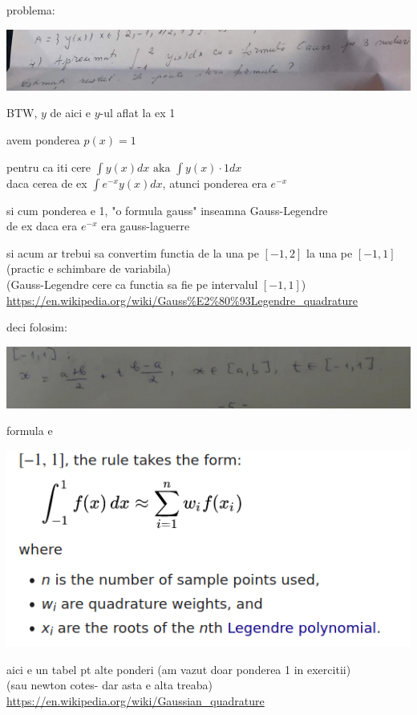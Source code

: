 \documentclass[11pt]{article}
\date{\today}
\title{}
\begin{document}
problema:
\begin{center}
\includegraphics[width=\linewidth]{./problema.png}
\end{center}

BTW, \(y\) de aici e \(y\)-ul aflat la ex 1

avem ponderea \(p(x) = 1\)
\medskip

pentru ca iti cere \(\displaystyle \int y(x) dx \text{ aka } \int y(x) \cdot 1 dx\)\\
daca cerea de ex \(\displaystyle \int e^{-x} y(x) dx\), atunci ponderea era \(e^{-x}\)
\medskip

si cum ponderea e 1, "o formula gauss" inseamna Gauss-Legendre\\
de ex daca era \(e^{-x}\) era gauss-laguerre
\medskip

si acum ar trebui sa convertim functia de la una pe \([-1, 2]\) la una pe \([-1, 1]\) (practic e schimbare de variabila)\\
(Gauss-Legendre cere ca functia sa fie pe intervalul \([-1, 1]\))\\
\url{https://en.wikipedia.org/wiki/Gauss\%E2\%80\%93Legendre\_quadrature}
\medskip

deci folosim:
\begin{center}
\includegraphics[width=\linewidth]{./a,b to -1,1.png}
\end{center}

formula e
\begin{center}
\includegraphics[width=.6\linewidth]{./formula.png}
\end{center}

aici e un tabel pt alte ponderi (am vazut doar ponderea 1 in exercitii)\\
(sau newton cotes- dar asta e alta treaba)\\
\url{https://en.wikipedia.org/wiki/Gaussian\_quadrature}
\end{document}
